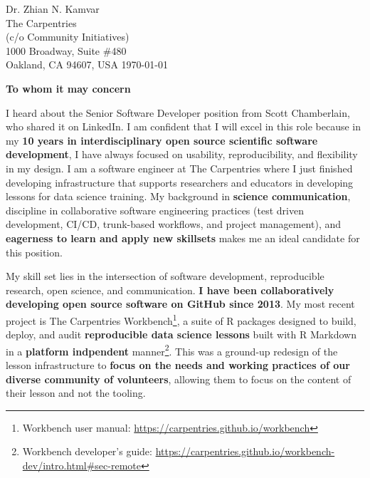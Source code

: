 


\clearpage
\begin{flushright}
  Dr. Zhian N. Kamvar\\
  The Carpentries\\
  (c/o Community Initiatives)\\
  1000 Broadway, Suite \#480\\
  Oakland, CA 94607, USA
  \today
\end{flushright}

\textbf{To whom it may concern}

\vspace{2ex}

I heard about the Senior Software Developer position from Scott Chamberlain, who
shared it on LinkedIn. I am confident that I will excel in
this role because in my \textbf{10 years in interdisciplinary open source
scientific software development}, I have always focused on usability,
reproducibility, and flexibility in my design.
I am a software engineer at The Carpentries where I just finished developing
infrastructure that supports researchers and educators in developing lessons
for data science training. 
My background in \textbf{science communication}, discipline in collaborative
software engineering practices (test driven development, CI/CD, trunk-based
workflows, and project management), and \textbf{eagerness to learn and apply
new skillsets} makes me an ideal candidate for this position. 

\vspace{2ex}

My skill set lies in the intersection of software development,
reproducible research, open science, and communication. 
\textbf{I have been collaboratively developing open source software on GitHub
since 2013}.
My most recent project is The Carpentries Workbench\footnote{Workbench user manual: \url{https://carpentries.github.io/workbench}}, 
a suite of R packages designed to build, deploy, and audit \textbf{reproducible
data science lessons} built with R Markdown in a \textbf{platform indpendent} manner\footnote{Workbench developer's guide: \url{https://carpentries.github.io/workbench-dev/intro.html\#sec-remote}}.
This was a ground-up redesign of the lesson infrastructure to \textbf{focus on
the needs and working practices of our diverse community of volunteers},
allowing them to focus on the content of their lesson and not the tooling.

